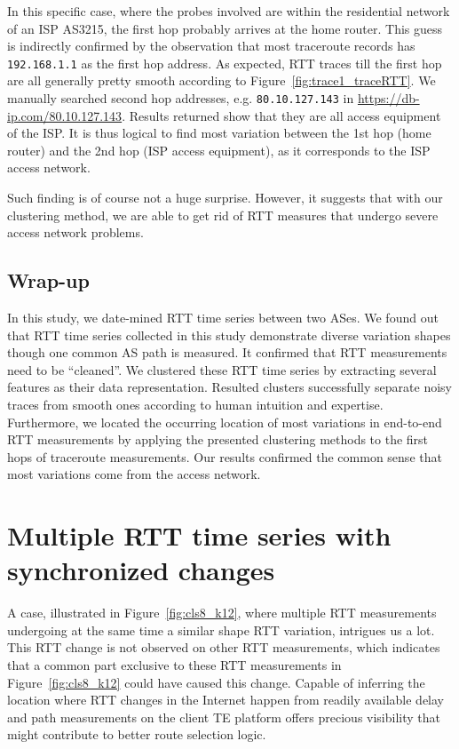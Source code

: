 In this specific case, where the probes involved are within the residential network of an ISP AS3215, the first hop probably arrives at the home router. This guess is indirectly confirmed by the observation that most traceroute records has \texttt{192.168.1.1} as the first hop address. As expected, RTT traces till the first hop are all generally pretty smooth according to Figure~\ref{fig:trace1_traceRTT}. We manually searched second hop addresses, e.g. \texttt{80.10.127.143} in \url{https://db-ip.com/80.10.127.143}. Results returned show that they are all access equipment of the ISP.
It is thus logical to find most variation between the 1st hop (home router) and the 2nd hop (ISP access equipment), as it corresponds to the ISP access network.  

Such finding is of course not a huge surprise.%
However, it suggests that with our clustering method, we are able to get rid of RTT measures that undergo severe access network problems. 

\subsection*{Wrap-up}
In this study, we date-mined RTT time series between two ASes. 
We found out that RTT time series collected in this study demonstrate diverse variation shapes though one common AS path is measured.
It confirmed that RTT measurements need to be ``cleaned''.
We clustered these RTT time series by extracting %
several features as their data representation. 
Resulted clusters successfully separate noisy traces from smooth ones according to human intuition and expertise.
Furthermore, we located the occurring location of most variations in end-to-end RTT measurements by applying the presented clustering methods to the first hops of traceroute measurements.
Our results confirmed the common sense that most variations come from the access network.

\section{Multiple RTT time series with synchronized changes}
\label{sec:ripe_case_study}

A case, illustrated in Figure~\ref{fig:cls8_k12}, where multiple RTT measurements undergoing at the same time a similar shape RTT variation, intrigues us a lot. This RTT change is not observed on other RTT measurements, which indicates that a common part exclusive to these RTT measurements in Figure~\ref{fig:cls8_k12} could have caused this change.
Capable of inferring the location where RTT changes in the Internet happen from readily available delay and path measurements on the client TE platform offers precious visibility that might contribute to better route selection logic.


